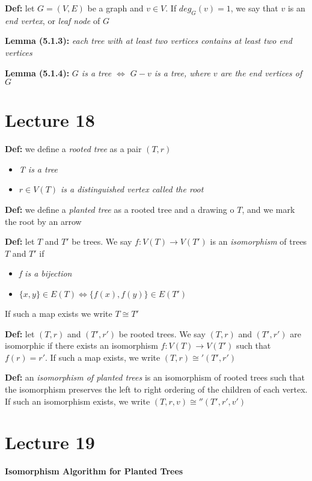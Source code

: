 \documentclass[12pt]{article}
\begin{document}
\textbf{Def: }let $G = (V, E)$ be a graph and $v \in V$. If $deg_G(v) = 1$, we say that $v$ is an \emph{end vertex}, or \emph{leaf node} of $G$

\textbf{Lemma (5.1.3): }\emph{each tree with at least two vertices contains at least two end vertices}

\textbf{Lemma (5.1.4): }\emph{$G$ is a tree $\Leftrightarrow$ $G - v$ is a tree, where $v$ are the end vertices of $G$}

\clearpage

\section{Lecture 18}
\textbf{Def: }we define a \emph{rooted tree} as a pair $(T, r)$ 
\begin{itemize}
    \item \emph{T is a tree}
    \item \emph{$r \in V(T)$ is a distinguished vertex called the root}
\end{itemize}

\textbf{Def: }we define a \emph{planted tree} as a rooted tree and a drawing o $T$, and we mark the root by an arrow

\textbf{Def: }let $T$ and $T'$ be trees. We say $f: V(T) \rightarrow V(T')$ is an \emph{isomorphism} of trees $T$ and $T'$ if 
\begin{itemize}
    \item \emph{f is a bijection}
    \item \emph{$\{ x, y \} \in E(T) \Leftrightarrow \{ f(x), f(y) \} \in E(T')$}
\end{itemize}
If such a map exists we write $T \cong T'$

\textbf{Def: }let $(T, r)$ and $(T', r')$ be rooted trees. We say $(T, r)$ and $(T', r')$ are isomorphic if there exists an isomorphism $f: V(T) \rightarrow V(T')$ such that $f(r) = r'$. If such a map exists, we write $(T, r) \cong' (T', r')$

\textbf{Def: }an \emph{isomorphism of planted trees} is an isomorphism of rooted trees such that the isomorphism preserves the left to right ordering of the children of each vertex. If such an isomorphism exists, we write $(T, r, v) \cong'' (T', r', v')$

\clearpage

\section{Lecture 19}
\textbf{Isomorphism Algorithm for Planted Trees}
\end{document}
